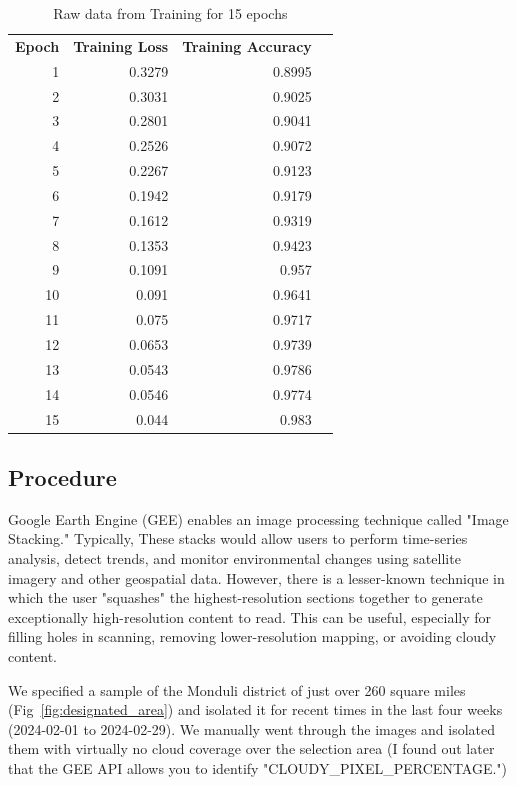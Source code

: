 \documentclass[10pt]{article}
\begin{document}
\begin{table} [H]
    \centering
    \begin{tabular}{rrrl}
    \multicolumn{1}{c}{\textbf{Epoch}} & \multicolumn{1}{c}{\textbf{Training Loss}} & \multicolumn{1}{c}{\textbf{Training Accuracy}} &  \\
    1  & 0.3279 & 0.8995 &  \\
    2  & 0.3031 & 0.9025 &  \\
    3  & 0.2801 & 0.9041 &  \\
    4  & 0.2526 & 0.9072 &  \\
    5  & 0.2267 & 0.9123 &  \\
    6  & 0.1942 & 0.9179 &  \\
    7  & 0.1612 & 0.9319 &  \\
    8  & 0.1353 & 0.9423 &  \\
    9  & 0.1091 & 0.957  &  \\
    10 & 0.091  & 0.9641 &  \\
    11 & 0.075  & 0.9717 &  \\
    12 & 0.0653 & 0.9739 &  \\
    13 & 0.0543 & 0.9786 &  \\
    14 & 0.0546 & 0.9774 &  \\
    15 & 0.044  & 0.983  & 
    \end{tabular}
    \caption{Raw data from Training for 15 epochs}
    \label{tab:training_raw_data}
\end{table}



\subsection{Procedure}
\label{procedure}

Google Earth Engine (GEE) enables an image processing technique called "Image Stacking." Typically, These stacks would allow users to perform time-series analysis, detect trends, and monitor environmental changes using satellite imagery and other geospatial data. However, there is a lesser-known technique in which the user "squashes" the highest-resolution sections together to generate exceptionally high-resolution content to read. This can be useful, especially for filling holes in scanning, removing lower-resolution mapping, or avoiding cloudy content. 

We specified a sample of the Monduli district of just over 260 square miles (Fig~\ref{fig:designated_area}) and isolated it for recent times in the last four weeks (2024-02-01 to 2024-02-29). We manually went through the images and isolated them with virtually no cloud coverage over the selection area (I found out later that the GEE API allows you to identify "CLOUDY\_PIXEL\_PERCENTAGE.")
\end{document}
